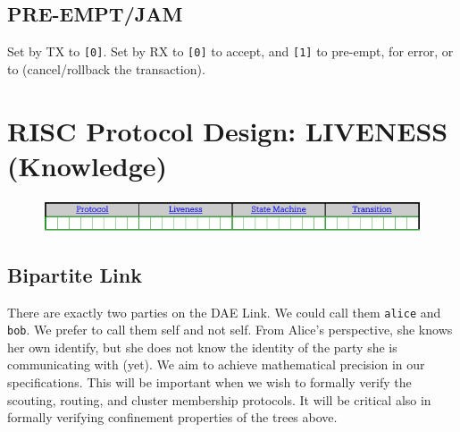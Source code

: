 \documentclass[../OAE-SPEC-MAIN.tex]{subfiles}
\begin{document}
\subsection{PRE-EMPT/JAM}


\nopagebreak[2]Set by TX to \texttt{[0]}. Set by RX to \texttt{[0]} to accept, and  \texttt{[1]} to pre-empt, for error, or to (cancel/rollback the transaction).

\newpage
 \section{RISC Protocol Design: LIVENESS (Knowledge)}

\begin{fullwidth}
 \begin{figure}
 
\includegraphics[width=1.6\linewidth]{./figures/First-Slice-Encodings.pdf}
\end{figure}
\end{fullwidth}


%


\subsection{Bipartite Link}

There are exactly two parties on the DAE Link. We could call them \texttt{alice} and \texttt{bob}. We prefer to call them self and not self. From Alice’s perspective, she knows her own identify, but she does not know the identity of the party she is communicating with (yet). We aim to achieve mathematical precision in our specifications. This will be important when we wish to formally verify the scouting, routing, and cluster membership protocols. It will be critical also in formally verifying confinement properties of the trees above.
\end{document}
